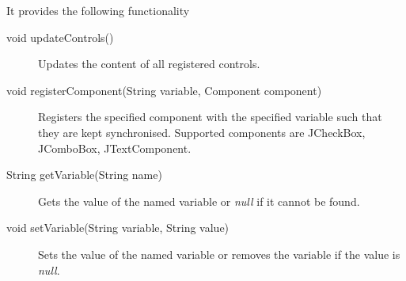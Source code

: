 \documentclass[11pt]{article}
\begin{document}
It provides the following functionality
\begin{description}
\item[void updateControls()]
Updates the content of all registered controls.
\item[void registerComponent(String variable, Component component)]
Registers the specified component with the specified variable such that they are kept synchronised. Supported components are JCheckBox, JComboBox, JTextComponent.
\item[String getVariable(String name)]
Gets the value of the named variable or \emph{null} if it cannot be found.
\item[void setVariable(String variable, String value)]
Sets the value of the named variable or removes the variable if the value is \emph{null}.
\end{description}
\end{document}
